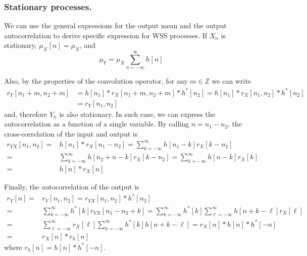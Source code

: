\subsubsection{Stationary processes.}

We can use the general expressions for the output mean and the output autocorrelation to derive specific expression for  WSS processes. If $X_n$ is stationary, $\mu_X[n]=\mu_X$, and
\begin{equation}
  \mu_Y = \mu_X \sum_{n=-\infty}^{\infty} h[n]
  \label{mediaout_stationary}
\end{equation}

Also, by the properties of the convolution operator, for any $m\in \mathbb{Z}$ we can write
\begin{align}
r_Y[n_1 + m, n_2 + m]
	&= h[n_1]*r_X[n_1 + m, n_2 + m]*h^*[n_2]
	 = h[n_1]*r_X[n_1, n_2]*h^*[n_2]  \nonumber\\
	&= r_Y[n_1, n_2]
\end{align}
and, therefore $Y_n$ is also stationary. In such case, we can express the autocorrelation as a function of a single variable. By calling $n=n_1-n_2$, the cross-correlation of the input and output is
\begin{align}
r_{YX}[n_1, n_2] 
    =& h[n_1] \ast r_X[n_1 - n_2]
    =  \sum_{k=-\infty}^{\infty} h[n_1 - k] r_X[k - n_2]  \nonumber \\
    =& \sum_{k=-\infty}^{\infty} h[n_2 + n - k] r_X[k - n_2]
    =  \sum_{k=-\infty}^{\infty} h[n - k] r_X[k] \nonumber \\
    =& h[n] \ast r_X[n]
  \label{RvuStationary}
\end{align}

Finally, the autocorrelation of the output is
\begin{align}
r_Y[n] 
	=& r_Y[n_1, n_2] = r_{YX}[n_1, n_2] \ast h^*[n_2]   \nonumber \\
  	=& \sum_{k=-\infty}^{\infty} h^*[k] r_{YX}[n_1-n_2+k]  
  	=  \sum_{k=-\infty}^{\infty} h^*[k]
  	   \sum_{\ell=-\infty}^{\infty} h[n+k-\ell] r_X[\ell] \nonumber \\
    =& \sum_{\ell=-\infty}^{\infty} r_X[\ell]
       \sum_{k=-\infty}^{\infty} h^*[k] h[n + k - \ell] 
  	=  r_X[n]*h[n]*h^*[-n] \nonumber \\
  	=& r_X[n]*r_h[n]
  \label{RvvStationary}
\end{align}
where $r_h[n]=h[n]*h^*[-n]$.



